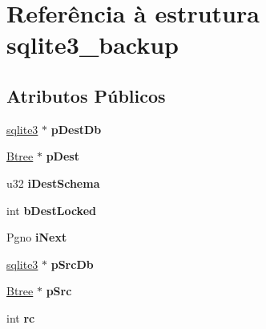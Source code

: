 \hypertarget{structsqlite3__backup}{\section{Referência à estrutura sqlite3\-\_\-backup}
\label{structsqlite3__backup}
}
\subsection*{Atributos Públicos}
\begin{DoxyCompactItemize}
\item 
\hypertarget{structsqlite3__backup_ad9b5074a860e01b31bbf9cb27f3808d9}{\hyperlink{structsqlite3}{sqlite3} $\ast$ {\bfseries p\-Dest\-Db}}\label{structsqlite3__backup_ad9b5074a860e01b31bbf9cb27f3808d9}

\item 
\hypertarget{structsqlite3__backup_a9e011336a89274f0ebfefdcede198f71}{\hyperlink{struct_btree}{Btree} $\ast$ {\bfseries p\-Dest}}\label{structsqlite3__backup_a9e011336a89274f0ebfefdcede198f71}

\item 
\hypertarget{structsqlite3__backup_a3f294f50b4ef206452dddd14f2a7cf6a}{u32 {\bfseries i\-Dest\-Schema}}\label{structsqlite3__backup_a3f294f50b4ef206452dddd14f2a7cf6a}

\item 
\hypertarget{structsqlite3__backup_aa0d385678bc5c3fd4da4201ff03a5856}{int {\bfseries b\-Dest\-Locked}}\label{structsqlite3__backup_aa0d385678bc5c3fd4da4201ff03a5856}

\item 
\hypertarget{structsqlite3__backup_a92454bf354f928aade2b2f92e6cfd088}{Pgno {\bfseries i\-Next}}\label{structsqlite3__backup_a92454bf354f928aade2b2f92e6cfd088}

\item 
\hypertarget{structsqlite3__backup_a0bcc0528bb3f5ec52eb40c3e7a4f7adc}{\hyperlink{structsqlite3}{sqlite3} $\ast$ {\bfseries p\-Src\-Db}}\label{structsqlite3__backup_a0bcc0528bb3f5ec52eb40c3e7a4f7adc}

\item 
\hypertarget{structsqlite3__backup_aa48f873d1de446638ff71fdae606e672}{\hyperlink{struct_btree}{Btree} $\ast$ {\bfseries p\-Src}}\label{structsqlite3__backup_aa48f873d1de446638ff71fdae606e672}

\item 
\hypertarget{structsqlite3__backup_aab860dbed6181702b4c6b80d43cde411}{int {\bfseries rc}}\label{structsqlite3__backup_aab860dbed6181702b4c6b80d43cde411}


\end{DoxyCompactItemize}
